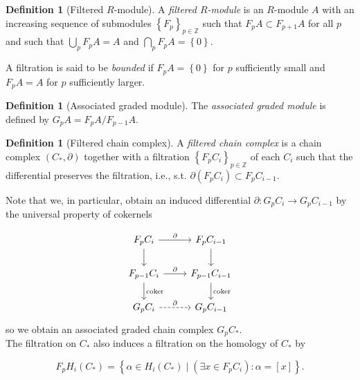 \documentclass[reqno]{amsart}
\theoremstyle{definition}
\newtheorem{definition}[theorem]{Definition}
\theoremstyle{remark}
\DeclareMathOperator{\coker}{coker}
\begin{document}
\begin{definition}[Filtered $R$-module]
    A \textit{filtered $R$-module} is an $R$-module
    $A$ with an increasing sequence
    of submodules 
    $\left\{ F_p \right\}_{p \in \mathbb{Z}}$ 
    such that $F_p A \subset F_{p+1}A$ for all
    $p$ and such that
    $\bigcup_{p} F_pA = A$ and
    $\bigcap_{p} F_p A = \left\{ 0 \right\} $.

    A filtration is said to be \textit{bounded} if
    $F_p A = \left\{ 0 \right\} $ for
    $p$ sufficiently small and
    $F_p A = A$ for $p$ sufficiently larger.
\end{definition}

\begin{definition}[Associated graded module]
    The \textit{associated graded module} is defined
    by $G_p A = F_p A / F_{p-1} A$.
\end{definition}

\begin{definition}[Filtered chain complex]
    A \textit{filtered chain complex} is a chain
    complex $\left( C_*, \partial \right) $ together
    with a filtration $\left\{ F_p C_i \right\}_{p \in \mathbb{Z}}$ 
    of each $C_i$ such that the differential preserves
    the filtration, i.e., s.t. 
    $\partial \left( F_p C_i \right) \subset F_p C_{i-1}$.
\end{definition}

Note that we, in particular, obtain an
induced differential
$\partial \colon G_p C_i \to G_{p} C_{i-1}$ by
the universal property of cokernels

\begin{equation*}
\begin{tikzcd}
    F_p C_i \ar[d] \ar[r, "\partial"] & F_p C_{i-1} \ar[d] \\
    F_{p-1} C_i \ar[d, "\coker"]
    \ar[r, "\partial"] & F_{p-1} C_{i-1} \ar[d, "\coker"] \\
    G_p C_i \ar[r, "\partial", dashed] & G_p C_{i-1}
\end{tikzcd}
\end{equation*}
so we obtain an associated graded
chain complex $G_p C_*$.\\
\linebreak
The filtration on $C_*$ also induces
a filtration on the homology of $C_*$ by

\[
F_p H_i (C_*) = 
\left\{ \alpha \in 
H_i (C_*)  \mid 
\left( \exists x \in F_p C_i \right) \colon
\alpha = \left[ x \right] \right\} .
\] 
\end{document}
